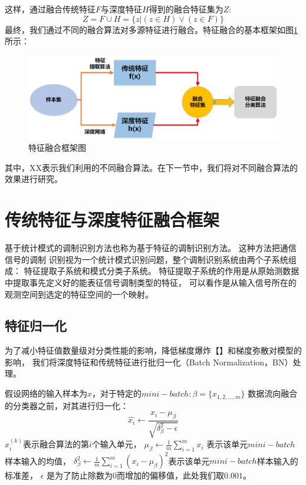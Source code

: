 这样，通过融合传统特征$F$与深度特征$H$得到的融合特征集为$Z$:
\begin{equation}
\label{eqt_4_17}
	Z =F \cup H = \{ z | (z \in H) \vee (z \in F) \}
\end{equation}
最终，我们通过不同的融合算法对多源特征进行融合。特征融合的基本框架如图\ref{sec:fig_4_1}所示：

\begin{figure}[!h]
	\centering
	\includegraphics[scale=0.5]{figures/chapter_4/fig_4_1.png}
	\caption{特征融合框架图}\label{sec:fig_4_1}
\end{figure}

其中，XX表示我们利用的不同融合算法。在下一节中，我们将对不同融合算法的效果进行研究。


\section{传统特征与深度特征融合框架}

基于统计模式的调制识别方法也称为基于特征的调制识别方法。
这种方法把通信信号的调制
识别视为一个统计模式识别问题，整个调制识别系统由两个子系统组成：
特征提取子系统和模式分类子系统。
特征提取子系统的作用是从原始测数据中提取事先定义好的能表征信号调制类型的特征，
可以看作是从输入信号所在的观测空间到选定的特征空间的一个映射。\par

\subsection{特征归一化}
\label{sec:feature_normalization}
为了减小特征值数量级对分类性能的影响，降低梯度爆炸【】和梯度弥散对模型的影响，
我们将深度特征和传统特征进行批归一化（Batch Normalization，BN）处理。\par

假设网络的输入样本为$x$，对于特定的$mini-batch: \beta=\{x_{1,2,...,m}\}$
数据流向融合的分类器之前，对其进行归一化：
\begin{equation}
	\label{eqt:4_18}
	\hat{x_i} \leftarrow \frac{x_i - \mu_\beta}{\sqrt{\delta_\beta^2 - \epsilon}}
\end{equation}
$x_i^{(k)}$表示融合算法的第$i$个输入单元，
$\mu_\beta \leftarrow \frac{1}{m}\sum_{i=1}^{m} x_i$ 表示该单元$mini-batch$样本输入的均值，
$	\delta_\beta^2 \leftarrow \frac{1}{m}\sum_{i=1}^{m}(x_i - \mu_\beta)^2$表示该单元$mini-batch$样本输入的标准差，
$\epsilon$ 是为了防止除数为$0$而增加的偏移值，此处我们取$0.001$。\par

